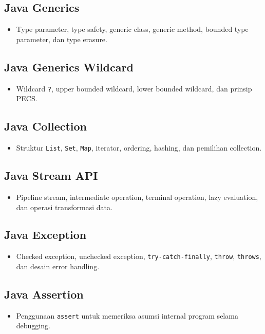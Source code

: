 \documentclass[11pt,a4paper]{article}
\begin{document}
\subsection{Java Generics}
\begin{itemize}
    \item Type parameter, type safety, generic class, generic method, bounded type parameter, dan type erasure.
\end{itemize}

\subsection{Java Generics Wildcard}
\begin{itemize}
    \item Wildcard \texttt{?}, upper bounded wildcard, lower bounded wildcard, dan prinsip PECS.
\end{itemize}

\subsection{Java Collection}
\begin{itemize}
    \item Struktur \texttt{List}, \texttt{Set}, \texttt{Map}, iterator, ordering, hashing, dan pemilihan collection.
\end{itemize}

\subsection{Java Stream API}
\begin{itemize}
    \item Pipeline stream, intermediate operation, terminal operation, lazy evaluation, dan operasi transformasi data.
\end{itemize}

\subsection{Java Exception}
\begin{itemize}
    \item Checked exception, unchecked exception, \texttt{try-catch-finally}, \texttt{throw}, \texttt{throws}, dan desain error handling.
\end{itemize}

\subsection{Java Assertion}
\begin{itemize}
    \item Penggunaan \texttt{assert} untuk memeriksa asumsi internal program selama debugging.
\end{itemize}
\end{document}
